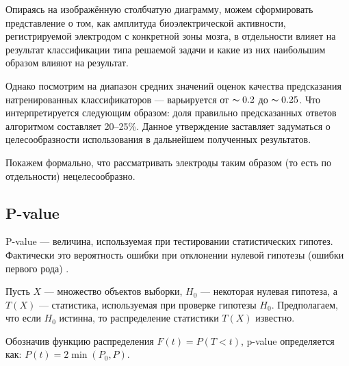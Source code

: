 Опираясь на изображённую столбчатую диаграмму, можем сформировать представление о том,
как амплитуда биоэлектрической активности, регистрируемой электродом с конкретной зоны
мозга, в отдельности влияет на результат классификации типа решаемой задачи и какие из
них наибольшим образом влияют на результат.

Однако посмотрим на диапазон средних значений оценок качества предсказания
натренированных классификаторов --- варьируется от $\thicksim 0.2$ до $\thicksim 0.25$.
Что интерпретируется следующим образом: доля правильно предсказанных ответов алгоритмом
составляет 20--25\%. Данное утверждение заставляет задуматься о целесообразности
использования в дальнейшем полученных результатов.

Покажем формально, что рассматривать электроды таким образом (то есть по отдельности)
нецелесообразно.

\subsection{P-value}

P-value --- величина, используемая при тестировании статистических гипотез. Фактически
это вероятность ошибки при отклонении нулевой гипотезы (ошибки первого рода) \cite{statistics}.

Пусть $X$ --- множество объектов выборки, $H_0$ --- некоторая нулевая гипотеза, а $T(X)$ --- статистика,
используемая при проверке гипотезы $H_0$. Предполагаем, что если $H_0$ истинна, то распределение
статистики $T(X)$ известно.

Обозначив функцию распределения $F(t)=P(T<t)$, p-value определяется как: $P(t)=2\min(P_{0},P)$.




